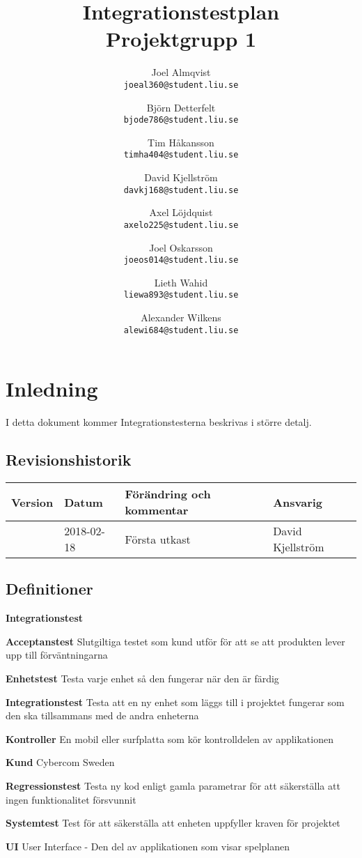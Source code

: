 \documentclass[10pt]{article}
\title{Integrationstestplan\\
    \large Projektgrupp 1}
\author{
    Joel Almqvist\\
    \texttt{joeal360@student.liu.se}
    \and
    Björn Detterfelt\\
    \texttt{bjode786@student.liu.se}
    \and
    Tim Håkansson\\
    \texttt{timha404@student.liu.se}
    \and
    David Kjellström\\
    \texttt{davkj168@student.liu.se}
    \and
    Axel Löjdquist\\
    \texttt{axelo225@student.liu.se}
    \and
    Joel Oskarsson\\
    \texttt{joeos014@student.liu.se}
    \and
    Lieth Wahid\\
    \texttt{liewa893@student.liu.se}
    \and
    Alexander Wilkens\\
    \texttt{alewi684@student.liu.se}
}
\begin{document}
\maketitle
\pagebreak
\tableofcontents
\pagebreak

\section{Inledning}
     I detta dokument kommer Integrationstesterna beskrivas i större detalj.
	\subsection{Revisionshistorik}

	
	\begin{center}
 	   \begin{tabular}{| l | l | l |  l | }
 	       \hline
 	       \textbf{Version} & \textbf{Datum} & \textbf{Förändring och kommentar} & \textbf{Ansvarig} \\
 	       \hline
 	       \centering 0.1 & 2018-02-18 & Första utkast & David Kjellström\\
 	       \hline
 	   \end{tabular}
	\end{center}


	\subsection{Definitioner}
  \begin{labeling}{\textbf{Integrationstest}}
  \item [\textbf{Acceptanstest}]Slutgiltiga testet som kund utför för att se att produkten lever upp till förväntningarna
    \item [\textbf{Enhetstest}] Testa varje enhet så den fungerar när den är färdig
    \item [\textbf{Integrationstest}] Testa att en ny enhet som läggs till i projektet fungerar som den ska tillsammans med de andra enheterna
    \item [\textbf{Kontroller}] En mobil eller surfplatta som kör kontrolldelen av applikationen
    \item [\textbf{Kund}] Cybercom Sweden
    \item [\textbf{Regressionstest}] Testa ny kod enligt gamla parametrar för att säkerställa att ingen funktionalitet försvunnit
    \item [\textbf{Systemtest}] Test för att säkerställa att enheten uppfyller kraven för projektet		
    \item [\textbf{UI}] User Interface - Den del av applikationen som visar spelplanen
  \end{labeling}
	
\end{document}
